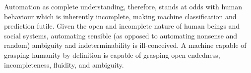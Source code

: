 

Automation as complete understanding, therefore, stands at odds with human behaviour which is inherently 
incomplete, %
making machine classification and prediction futile. Given the open and incomplete nature of human beings and social systems, automating sensible (as opposed to automating nonsense and random) ambiguity and indeterminability is ill-conceived. A machine capable of grasping humanity by definition is capable of grasping open-endedness, incompleteness, fluidity, and ambiguity.

